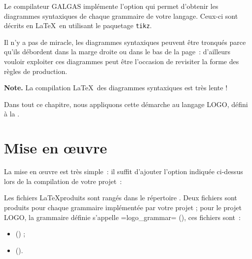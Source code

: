 



Le compilateur GALGAS implémente l'option  qui permet d'obtenir les diagrammes syntaxiques de chaque grammaire de votre langage. Ceux-ci sont décrits en \LaTeX~en utilisant le paquetage \texttt{tikz}\label{tikz}. %

Il n'y a pas de miracle, les diagrammes syntaxiques peuvent être tronqués parce qu'ils débordent dans la marge droite ou dans le bas de la page~: d'ailleurs vouloir exploiter ces diagrammes peut être l'occasion de revisiter la forme des règles de production.

{\bf Note.} La compilation \LaTeX~des diagrammes syntaxiques est très lente !

Dans tout ce chapitre, nous appliquons cette démarche au langage LOGO, défini à la .

\section{Mise en œuvre}

La mise en œuvre est très simple~: il suffit d'ajouter l'option indiquée ci-dessus lors de la compilation de votre projet~:
\begin{description}
  \item[ ] 
\end{description}

Les fichiers \LaTeX produits sont rangés dans le répertoire . Deux fichiers sont produits pour chaque grammaire implémentée par votre projet ; pour le projet LOGO, la grammaire définie s'appelle \ggst=logo_grammar= (), ces fichiers sont~:
\begin{itemize}
\item {} () ;
\item {} ().
\end{itemize}


